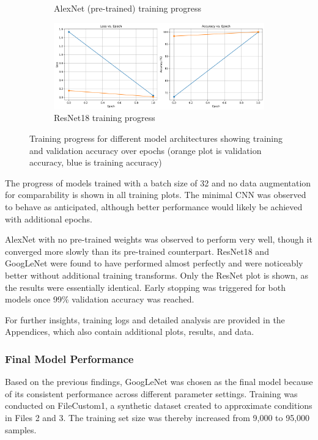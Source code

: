 \documentclass[conference]{IEEEtran}
\begin{document}
\begin{figure}[h]
\begin{subfigure}[b]{0.45\textwidth}
      \caption{AlexNet (pre-trained) training progress}
      \label{fig:progress_alexnet}
    \end{subfigure}
    \hfill
    \begin{subfigure}[b]{0.45\textwidth}
        \centering
        \includegraphics[width=\textwidth]{images/training_progress_ResNet.png}
        \caption{ResNet18 training progress}
        \label{fig:progress_resnet}
    \end{subfigure}
    \caption{Training progress for different model architectures showing training and validation accuracy over epochs (orange plot is validation accuracy,
    blue is training accuracy)}
    \label{fig:training_progress}
\end{figure}

The progress of models trained with a batch size of 32 and no data augmentation for comparability is shown in all training plots. The
minimal CNN was observed to behave as anticipated, although better performance would likely be achieved with additional epochs. 

AlexNet with no pre-trained weights was observed to perform very well, though it converged more slowly than its pre-trained counterpart.
ResNet18 and GoogLeNet were found to have performed almost perfectly and were noticeably better without additional training transforms.
Only the ResNet plot is shown, as the results were essentially identical. Early stopping was triggered for both models once 99\% 
validation accuracy was reached.

For further insights, training logs and detailed analysis are provided in the Appendices, which also contain additional plots, results, and data.

\subsubsection{Final Model Performance}

Based on the previous findings, GoogLeNet was chosen as the final model because of its consistent performance across different parameter
settings. Training was conducted on FileCustom1, a synthetic dataset created to approximate conditions in Files 2 and 3. The training set
size was thereby increased from 9,000 to 95,000 samples.
\end{document}
